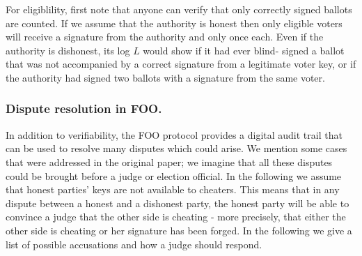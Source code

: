 \documentclass[envcountsame]{llncs}
\begin{document}
For eligiblility, first note that anyone can verify that only correctly signed
ballots are counted. If we assume that the authority is honest then only
eligible voters will receive a signature from the authority and only once each.
Even if the authority is dishonest, its log $L$ would show if it had ever blind-
signed a ballot that was not accompanied by a correct signature from a
legitimate voter key, or if the authority had signed two ballots with a
signature from the same voter.

\subsubsection{Dispute resolution in FOO.}

In addition to verifiability, the FOO protocol provides a digital audit trail
that can be used to resolve many disputes which could arise. We mention some
cases that were addressed in the original paper; we imagine that all these
disputes could be brought before a judge or election official.
In the following we assume that honest parties' keys are not available to
cheaters. This means that in any dispute between a honest and a dishonest party,
the honest party will be able to convince a judge that the other side is
cheating - more precisely, that either the other side is cheating or her
signature has been forged.
In the following we give a list of possible accusations and how a judge should
respond.
\end{document}
